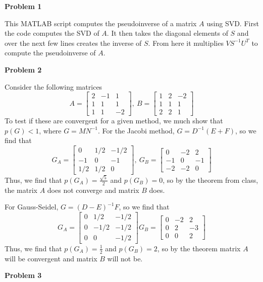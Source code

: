 \documentclass{article}
\newcommand{\Problem}[1]{\textbf{\large Problem #1}}
\begin{document}
\Problem{1}

This MATLAB script computes the pseudoinverse of a matrix $A$ using SVD. 
First the code computes the SVD of $A$.
It then takes the diagonal elements of $S$ and over the next few lines creates the inverse of $S$.
From here it multiplies $VS^{-1}U^T$ to compute the pseudoinverse of $A$. 


\Problem{2}

Consider the following matrices
$$A = \begin{bmatrix} 2 & -1 & 1\\ 1 & 1 & 1\\ 1 & 1 & -2 \end{bmatrix},\ B = \begin{bmatrix} 1 & 2 & -2 \\ 1 & 1 & 1 \\ 2 & 2 & 1 \end{bmatrix}$$
To test if these are convergent for a given method, we much show that $p(G) < 1$, where $G = MN^{-1}$. 
For the Jacobi method, $G = D^{-1}(E + F)$, so we find that
$$G_A = \begin{bmatrix} 0 & 1/2 & -1/2 \\ -1 & 0 & -1 \\ 1/2 & 1/2 & 0 \end{bmatrix},\ G_B = \begin{bmatrix} 0 & -2 & 2 \\ -1 & 0 & -1 \\ -2 & -2 & 0 \end{bmatrix}$$
Thus, we find that $p(G_A) = \frac{\sqrt{5}}{2}$ and $p(G_B) = 0$, so by the theorem from class, the matrix $A$ does not converge and matrix $B$ does. 

For Gauss-Seidel, $G = (D - E)^{-1}F$, so we find that 
$$G_A = \begin{bmatrix} 0 & 1/2 & -1/2 \\ 0 & -1/2 & -1/2 \\ 0 & 0 & -1/2 \end{bmatrix}
G_B = \begin{bmatrix} 0 & -2 & 2 \\ 0 & 2 & -3 \\ 0 & 0 & 2 \end{bmatrix} $$
Thus, we find that $p(G_A) = \frac{1}{2}$ and $p(G_B) = 2$, so by the theorem matrix $A$ will be convergent and matrix $B$ will not be. 

\Problem{3}
\end{document}
